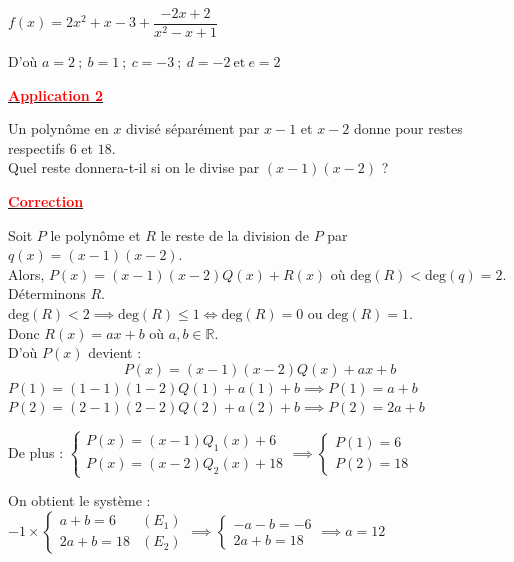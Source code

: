 \documentclass[12pt,a4paper]{article}
\begin{document}
\noindent $f(x) = 2x^2 + x - 3 + \dfrac{-2x + 2}{x^2 - x + 1}$

\vspace{1.5em}

\noindent D'où {\color{red} $a = 2 \ ; \ b = 1 \ ; \ c = -3 \ ; \ d = -2 \ \text{et} \ e = 2$}

\begin{center}
    \textbf{\underline{\textcolor{red}{Application 2 }}}
\end{center}

\noindent Un polynôme en $x$ divisé séparément par $x-1$ et $x-2$ donne pour restes respectifs $6$ et $18$. \\
Quel reste donnera-t-il si on le divise par $(x-1)(x-2)$ ?

\begin{center}
    \textbf{\underline{\textcolor{red}{Correction}}}
\end{center}

\noindent Soit $P$ le polynôme et $R$ le reste de la division de $P$ par $q(x) = (x-1)(x-2)$. \\
Alors, $P(x) = (x-1)(x-2)Q(x) + R(x)$ où $\text{deg}(R) < \text{deg}(q) = 2$. \\
Déterminons $R$. \\
$\text{deg}(R) < 2 \implies \text{deg}(R) \leq 1 \iff \text{deg}(R) = 0 \text{ ou } \text{deg}(R) = 1$. \\
Donc $R(x) = ax + b$ où $a, b \in \mathbb{R}$. \\
D'où $P(x)$ devient :
$$P(x) = (x-1)(x-2)Q(x) + ax + b$$
$P(1) = (1-1)(1-2)Q(1) + a(1) + b \implies P(1) = a + b$ \\
$P(2) = (2-1)(2-2)Q(2) + a(2) + b \implies P(2) = 2a + b$

\noindent De plus :
$\begin{cases} P(x) = (x-1)Q_1(x) + 6 \\ P(x) = (x-2)Q_2(x) + 18 \end{cases} \implies \begin{cases} P(1) = 6 \\ P(2) = 18 \end{cases}$

\noindent On obtient le système :
$-1 \times \begin{cases} a + b = 6 & (E_1) \\ 2a + b = 18 & (E_2) \end{cases} \implies \begin{cases} -a - b = -6 \\ 2a + b = 18 \end{cases} \implies a = 12$
\end{document}
